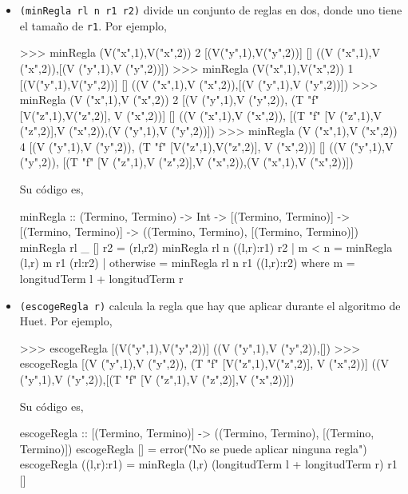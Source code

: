 \begin{itemize}

\item \texttt{(minRegla rl n r1 r2)}  divide un
  conjunto de reglas en dos, donde uno tiene el tamaño de \texttt{r1}. Por
  ejemplo,
  \begin{sesion}
>>> minRegla (V("x",1),V("x",2)) 2 [(V("y",1),V("y",2))] []
((V ("x",1),V ("x",2)),[(V ("y",1),V ("y",2))])
>>> minRegla (V("x",1),V("x",2)) 1 [(V("y",1),V("y",2))] []
((V ("x",1),V ("x",2)),[(V ("y",1),V ("y",2))])
>>> minRegla (V ("x",1),V ("x",2)) 2
             [(V ("y",1),V ("y",2)),
              (T "f" [V("z",1),V("z",2)], V ("x",2))] []
((V ("x",1),V ("x",2)),
 [(T "f" [V ("z",1),V ("z",2)],V ("x",2)),(V ("y",1),V ("y",2))])
>>> minRegla (V ("x",1),V ("x",2)) 4 [(V ("y",1),V ("y",2)),
             (T "f" [V("z",1),V("z",2)], V ("x",2))] []
((V ("y",1),V ("y",2)),
 [(T "f" [V ("z",1),V ("z",2)],V ("x",2)),(V ("x",1),V ("x",2))])
  \end{sesion}

  Su código es,

  \begin{codigo}
minRegla :: (Termino, Termino) -> Int -> [(Termino, Termino)]
     -> [(Termino, Termino)]
     -> ((Termino, Termino), [(Termino, Termino)])
minRegla rl _ [] r2 = (rl,r2)
minRegla rl n ((l,r):r1) r2
    | m < n = minRegla (l,r) m r1 (rl:r2)
    | otherwise = minRegla rl n r1 ((l,r):r2)
    where m = longitudTerm l + longitudTerm r
  \end{codigo}

\item \texttt{(escogeRegla r)}  calcula la regla
  que hay que aplicar durante el algoritmo de Huet. Por ejemplo,

  \begin{sesion}
>>> escogeRegla [(V("y",1),V("y",2))]
((V ("y",1),V ("y",2)),[])
>>> escogeRegla [(V ("y",1),V ("y",2)),
                 (T "f" [V("z",1),V("z",2)], V ("x",2))]
((V ("y",1),V ("y",2)),[(T "f" [V ("z",1),V ("z",2)],V ("x",2))])
  \end{sesion}

  Su código es,

  \begin{codigo}
escogeRegla :: [(Termino, Termino)]
            -> ((Termino, Termino), [(Termino, Termino)])
escogeRegla [] = error("No se puede aplicar ninguna regla")
escogeRegla ((l,r):r1) = minRegla (l,r)
                         (longitudTerm l + longitudTerm r)
                         r1 []
  \end{codigo}


\end{itemize}
